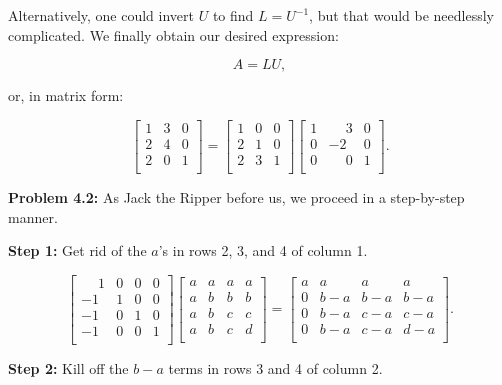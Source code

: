\documentclass{article}
\begin{document}
Alternatively, one could invert $U$ to find $L = U^{-1}$, but that would be needlessly complicated. We finally obtain our desired expression:

\[
A = LU,
\]

or, in matrix form:

\[
\begin{bmatrix}
1 & 3 & 0\\
2 & 4 & 0\\
2 & 0 & 1\\
\end{bmatrix}
=
\begin{bmatrix}
1 & 0 & 0\\
2 & 1 & 0\\
2 & 3 & 1\\
\end{bmatrix}
\begin{bmatrix}
1 & \phantom{-}3 & 0\\
0 & -2 & 0\\
0 & \phantom{-}0 & 1\\
\end{bmatrix}.
\]

\noindent \textbf{Problem 4.2:} As Jack the Ripper before us, we proceed in a step-by-step manner.

\noindent \textbf{Step 1:} Get rid of the $a$'s in rows 2, 3, and 4 of column 1.

\[
\begin{bmatrix}
\phantom{-}1 & 0 & 0 & 0\\
-1 & 1 & 0 & 0\\
-1 & 0 & 1 & 0\\
-1 & 0 & 0 & 1\\
\end{bmatrix}
\begin{bmatrix}
a & a & a & a\\
a & b & b & b\\
a & b & c & c\\
a & b & c & d\\
\end{bmatrix}
=
\begin{bmatrix}
a & a & a & a\\
0 & b - a & b - a & b - a\\
0 & b - a & c - a & c - a\\
0 & b - a & c - a & d - a\\
\end{bmatrix}.
\]

\noindent \textbf{Step 2:} Kill off the $b - a$ terms in rows 3 and 4 of column 2.
\end{document}
